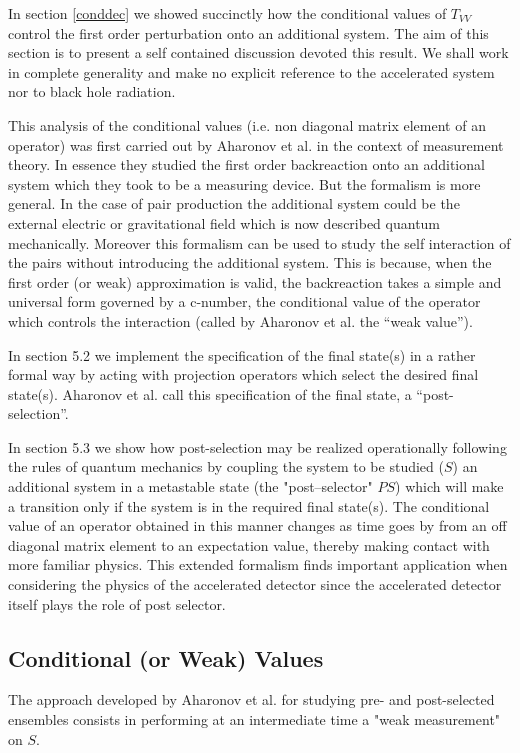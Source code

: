 \documentclass[12pt]{article}
\begin{document}
In section \ref{conddec} we showed succinctly  how the conditional values of
$T_{VV}$  control the first order perturbation onto an additional
system. The aim of this section is to present a self contained
discussion devoted this result.
We shall work in complete
generality and make no explicit reference to the accelerated
system nor to black hole radiation.

This analysis of the conditional values (i.e. non diagonal
matrix element of an
operator)  was first carried out by Aharonov et al. \cite{aharo}
in the context of
measurement theory. In
essence they studied the first order backreaction
 onto an
additional system
which they took to be a measuring device. But the formalism is
more general. In the case of pair production the additional system could
be the external electric or gravitational field which is now
described quantum mechanically. Moreover this formalism can be used to
study the self interaction of
the pairs without introducing the additional system. This is because,
when the first order (or weak)  approximation is
valid, the backreaction takes a simple and universal form governed by  a
c-number, the conditional value of the operator which controls the
interaction (called by Aharonov et al. the ``weak value'').

In section 5.2 we implement the specification of the
final state(s) in a  rather formal way by acting  with projection
operators  which select
the desired final state(s). Aharonov et al.  call this
specification of the final state, a ``post-selection''.

In section 5.3 we show
how  post-selection may be realized operationally following the rules of
quantum mechanics by coupling the system to be studied ($S$)
an  additional system in a metastable
state   (the "post--selector" $PS$) which will make a transition only if the
system is in the required  final state(s).
The conditional value of an operator obtained in this manner changes as time
goes by from an off diagonal matrix element
to an expectation value, thereby making
contact with more familiar physics. This extended formalism finds important
application when considering the physics of the accelerated detector since
the accelerated detector itself plays the role of post selector.

\subsection{Conditional (or Weak) Values}

The approach developed by
Aharonov et al.\cite{aharo} for studying pre- and post-selected
ensembles
consists in performing at an intermediate time a "weak measurement"
on $S$.
\end{document}
